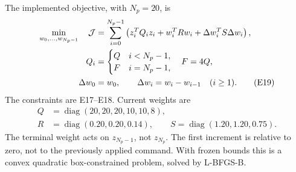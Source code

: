 \documentclass[11pt,a4paper]{article}
\newcommand{\diag}{\operatorname{diag}}
\begin{document}
The implemented objective, with $N_p=20$, is
\begin{align}
\min_{w_0,\ldots,w_{N_p-1}}\quad\mathcal J
&=\sum_{i=0}^{N_p-1}\left(z_i^TQ_i z_i+w_i^TRw_i+\Delta w_i^TS\Delta w_i\right),\notag\\
Q_i&=\begin{cases}Q&i<N_p-1,\\F&i=N_p-1,\end{cases}\quad F=4Q,\notag\\
\Delta w_0&=w_0,\qquad\Delta w_i=w_i-w_{i-1}\quad(i\ge1).\tag{E19}
\end{align}
The constraints are E17--E18. Current weights are
\begin{align*}
Q&=\diag(20,20,20,10,10,8),\\
R&=\diag(0.20,0.20,0.14),\qquad S=\diag(1.20,1.20,0.75).
\end{align*}
The terminal weight acts on $z_{N_p-1}$, not $z_{N_p}$. The first increment
is relative to zero, not to the previously applied command. With frozen bounds
this is a convex quadratic box-constrained problem, solved by L-BFGS-B.
\end{document}

